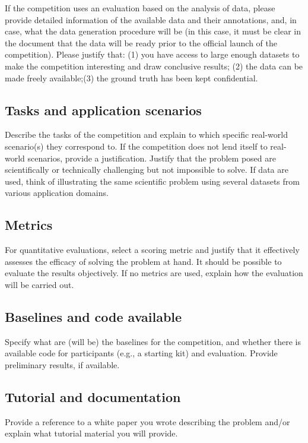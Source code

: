 \documentclass[11pt, oneside]{article}
\begin{document}
If the competition uses an evaluation based on the analysis of data,
please provide detailed information of the available data and
their annotations, and, in case, what the data generation
procedure will be (in this case, it must be clear in the document
that the data will be ready prior to the official launch of the
competition). Please justify that: (1) you have access to large
enough datasets to make the competition interesting and draw
conclusive
 results; (2) the data can be made freely available;(3) the ground truth has been kept confidential.

\subsection{Tasks and application scenarios}

Describe the tasks of the competition and explain to which specific real-world scenario(s) they correspond to. If the competition does not lend itself
to real-world scenarios, provide a justification. Justify that the problem posed are scientifically or technically challenging but not impossible to
solve. If data are used, think of illustrating the same scientific problem using several datasets from various application domains.


\subsection{Metrics}

For quantitative evaluations, select a scoring metric and justify
that it effectively assesses the efficacy of solving the problem
at hand. It should be possible to evaluate the results
objectively. If no metrics are used, explain how the evaluation
will be carried out.

\subsection{Baselines and code available}

Specify what are (will be) the baselines for the competition, and
whether there is available code for participants (e.g., a starting
kit) and evaluation. Provide preliminary results, if available.

\subsection{Tutorial and documentation}

Provide a reference to a white paper you wrote describing the
problem and/or explain what tutorial material you will provide.
\end{document}
